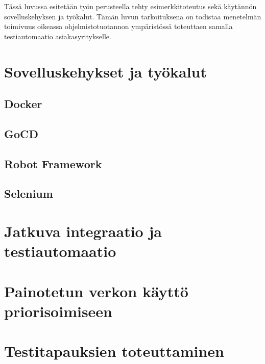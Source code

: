 Tässä luvussa esitetään työn perusteella tehty esimerkkitoteutus sekä käytännön sovelluskehyksen ja työkalut.
Tämän luvun tarkoituksena on todistaa menetelmän toimivuus oikeassa ohjelmistotuotannon ympäristössä toteuttaen samalla testiautomaatio asiakasyritykselle.

\section{Sovelluskehykset ja työkalut}

  \subsection{Docker}

  \subsection{GoCD}

  \subsection{Robot Framework}

  \subsection{Selenium}

\section{Jatkuva integraatio ja testiautomaatio}

\section{Painotetun verkon käyttö priorisoimiseen}

\section{Testitapauksien toteuttaminen}
